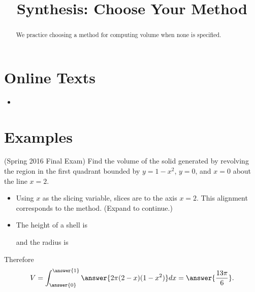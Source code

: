 \documentclass{ximera}
\title{Synthesis: Choose Your Method}
\begin{document}
\begin{abstract}
We practice choosing a method for computing volume when none is specified.
\end{abstract}
\maketitle

\section*{Online Texts}
\begin{itemize}
\item {}
\end{itemize}

\section*{Examples}

\begin{example}
(Spring 2016 Final Exam) Find the volume of the solid generated by revolving the region in the first quadrant bounded by $y = 1-x^2$, $y = 0$, and $x = 0$ about the line $x=2$.
\begin{itemize}
\item Using $x$ as the slicing variable, slices are  to the axis $x=2$. This alignment corresponds to the  method.
(Expand to continue.)
\end{itemize}
\begin{expandable}
\begin{itemize}
\item The height of a shell is 
\begin{multipleChoice}
\end{multipleChoice}
and the radius is
\begin{multipleChoice}
\end{multipleChoice}
\end{itemize}
Therefore
\[ V = \int_{\answer{0}}^{\answer{1}} \answer{2 \pi (2-x)(1-x^2)} dx = \answer{\frac{13 \pi}{6}}. \]
\end{expandable}
\end{example}
\end{document}
